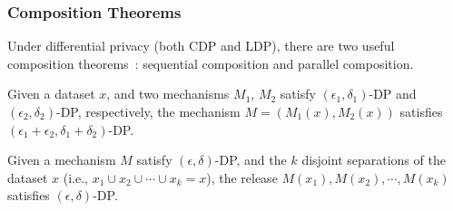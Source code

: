 \subsubsection{Composition Theorems}
Under differential privacy (both CDP and LDP), there are two useful composition theorems~\cite{li2017differential}: sequential composition and parallel composition.

\begin{definition}
	Given a dataset $x$, and two mechanisms $M_1$, $M_2$ satisfy $(\epsilon_1, \delta_1)$-DP and $(\epsilon_2, \delta_2)$-DP, respectively, the mechanism $M=(M_1(x), M_2(x))$ satisfies $(\epsilon_1+\epsilon_2, \delta_1+\delta_2)$-DP.
\end{definition}

\begin{definition}
	Given a mechanism $M$ satisfy $(\epsilon, \delta)$-DP, and the $k$ disjoint separations of the dataset $x$ (i.e., $x_1\cup x_2\cup \cdots \cup x_k=x$), the release $M(x_1), M(x_2), \cdots, M(x_k)$ satisfies $(\epsilon, \delta)$-DP.
\end{definition}




